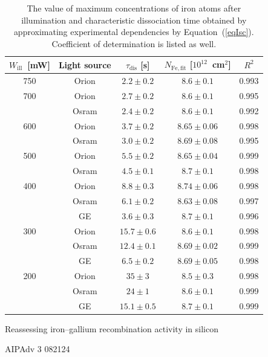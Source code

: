 \documentclass{WileyMSP-template}
\begin{document}
\begin{table}
 \caption{The value of maximum concentrations of iron atoms after illumination and
characteristic dissociation time obtained by approximating experimental dependencies by Equation~(\ref{eqIsc}).
Coefficient of determination is listed as well.}
 \label{tb1}
  \begin{tabular}[htbp]{@{}ccccc@{}}
    \hline
    $W_\mathrm{ill}$~[mW] & Light source & $\tau_\mathrm{dis}$ [s] & $N_\mathrm{Fe,fit}$ [$10^{12}$~cm$^2$] & $R^2$ \\
    \hline
    750  & Orion  & $2.2\pm0.2$ & $8.6\pm0.1$ & 0.993 \\
    700  & Orion  & $2.7\pm0.2$ & $8.6\pm0.1$ & 0.995 \\
         & Osram  & $2.4\pm0.2$ & $8.6\pm0.1$ & 0.992 \\
    600  & Orion  & $3.7\pm0.2$ & $8.65\pm0.06$ & 0.998 \\
         & Osram  & $3.0\pm0.2$ & $8.69\pm0.08$ & 0.995 \\
    500  & Orion  & $5.5\pm0.2$ & $8.65\pm0.04$ & 0.999 \\
         & Osram  & $4.5\pm0.1$ & $8.7\pm0.1$ & 0.998 \\
    400  & Orion  & $8.8\pm0.3$ & $8.74\pm0.06$ & 0.998 \\
         & Osram  & $6.1\pm0.2$ & $8.63\pm0.08$ & 0.997 \\
         & GE  & $3.6\pm0.3$ & $8.7\pm0.1$ & 0.996 \\
    300  & Orion  & $15.7\pm0.6$ & $8.6\pm0.1$ & 0.998 \\
         & Osram  & $12.4\pm0.1$ & $8.69\pm0.02$ & 0.999 \\
         & GE  & $6.5\pm0.2$ & $8.69\pm0.05$ & 0.998 \\
    200  & Orion  & $35\pm3$ & $8.5\pm0.3$ & 0.998 \\
         & Osram  & $24\pm1$ & $8.6\pm0.1$ & 0.999 \\
         & GE  & $15.1\pm0.5$ & $8.7\pm0.1$ & 0.999 \\
    \hline
  \end{tabular}
\end{table}





Reassessing iron–gallium recombination activity in silicon \cite{Le2024}

AIPAdv 3 082124 \cite{FeBStrongIll}
\end{document}

